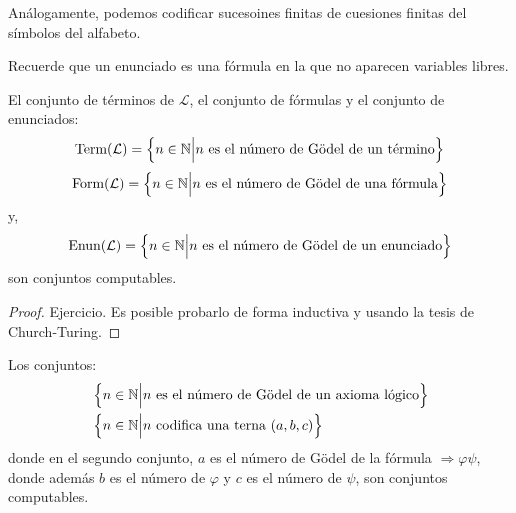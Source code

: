 \documentclass[12pt]{report}
\newcounter{it}
\theoremstyle{largebreak}
\begin{document}
    Análogamente, podemos codificar sucesoines finitas de cuesiones finitas del símbolos del alfabeto.

    \begin{obs}
        Recuerde que un enunciado es una fórmula en la que no aparecen variables libres.
    \end{obs}

    \begin{theor}
        El conjunto de términos de $\mathcal{L}$, el conjunto de fórmulas y el conjunto de enunciados:
        \begin{equation*}
            \textup{Term}(\mathcal{L})=\left\{n\in\mathbb{N}\Big|n\textup{ es el número de Gödel de un término}\right\}
        \end{equation*}
        \begin{equation*}
            \textup{Form}(\mathcal{L})=\left\{n\in\mathbb{N}\Big|n\textup{ es el número de Gödel de una fórmula}\right\}
        \end{equation*}
        y,
        \begin{equation*}
            \textup{Enun}(\mathcal{L})=\left\{n\in\mathbb{N}\Big|n\textup{ es el número de Gödel de un enunciado}\right\}
        \end{equation*}
        son conjuntos computables.
    \end{theor}

    \begin{proof}
        Ejercicio. Es posible probarlo de forma inductiva y usando la tesis de Church-Turing.
    \end{proof}
    
    \begin{theor}
        Los conjuntos:
        \begin{equation*}
            \begin{split}
                &\left\{n\in\mathbb{N}\Big|n\textup{ es el número de Gödel de un axioma lógico} \right\}\\
                &\left\{n\in\mathbb{N}\Big|n\textup{ codifica una terna }(a,b,c) \right\}\\
            \end{split}
        \end{equation*}
        donde en el segundo conjunto, $a$ es el número de Gödel de la fórmula $\Rightarrow\varphi\psi$, donde además $b$ es el número de $\varphi$ y $c$ es el número de $\psi$, son conjuntos computables.
    \end{theor}
\end{document}
